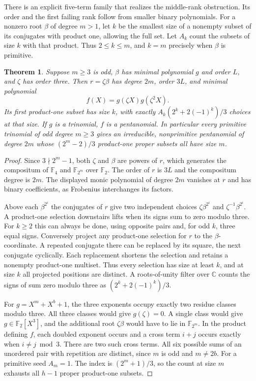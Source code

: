 \documentclass[11pt]{article}
\newtheorem{theorem}{Theorem}
\newcommand{\F}{\mathbb F_2}
\begin{document}
There is an explicit five-term family that realizes the middle-rank
obstruction. Its order and the first failing rank follow from smaller
binary polynomials. For a nonzero root \(\beta\) of degree \(m>1\),
let \(k\) be the smallest size of a nonempty subset of its conjugates
with product one, allowing the full set. Let \(A_k\) count the
subsets of size \(k\) with that product. Thus \(2\le k\le m\), and
\(k=m\) precisely when \(\beta\) is primitive.

\begin{theorem}\label{thm:cubic-root-twist}
Suppose \(m\ge3\) is odd, \(\beta\) has minimal polynomial \(g\) and
order \(L\), and \(\zeta\) has order three. Then \(r=\zeta\beta\)
has degree \(2m\), order \(3L\), and minimal polynomial
\[
                      f(X)=g(\zeta X)g(\zeta^2 X).
\]
Its first product-one subset has size \(k\), with exactly
\(A_k(2^k+2(-1)^k)/3\) choices at that size. If \(g\) is a trinomial,
\(f\) is a pentanomial. In particular every primitive trinomial
of odd degree \(m\ge3\) gives an irreducible, nonprimitive pentanomial
of degree \(2m\) whose \((2^m-2)/3\) product-one proper subsets
all have size \(m\).
\end{theorem}
\begin{proof}
Since \(3\nmid 2^m-1\), both \(\zeta\) and \(\beta\) are powers of
\(r\), which generates the compositum of \(\mathbb F_4\) and
\(\mathbb F_{2^m}\) over \(\mathbb F_2\). The order of \(r\) is
\(3L\) and the compositum degree is \(2m\). The displayed monic
polynomial of degree \(2m\) vanishes at \(r\) and has binary
coefficients, as Frobenius interchanges its factors.

Above each \(\beta^{2^i}\) the conjugates of \(r\) give two independent
choices \(\zeta\beta^{2^i}\) and \(\zeta^{-1}\beta^{2^i}\). A
product-one selection downstairs lifts when its signs sum to zero
modulo three. For \(k\ge2\) this can always be done, using opposite
pairs and, for odd \(k\), three equal signs. Conversely project
any product-one selection for \(r\) to the \(\beta\)-coordinate.
A repeated conjugate there can be replaced by its square, the next
conjugate cyclically. Each replacement shortens the selection and
retains a nonempty product-one multiset. Thus every selection has
size at least \(k\), and at size \(k\) all projected positions are
distinct. A roots-of-unity filter over \(\mathbb C\) counts the
signs of sum zero modulo three as \((2^k+2(-1)^k)/3\).

For \(g=X^m+X^b+1\), the three exponents occupy exactly two residue
classes modulo three. All three classes would give \(g(\zeta)=0\).
A single class would give \(g\in\F[X^3]\), and the additional root
\(\zeta\beta\) would have to lie in \(\mathbb F_{2^m}\).
In the product defining \(f\), each doubled exponent occurs and
a cross term \(i+j\) occurs exactly when \(i\ne j\bmod3\).
There are two such cross terms. All six possible sums of an unordered
pair with repetition are distinct, since \(m\) is odd and \(m\ne2b\).
For a primitive seed \(A_m=1\). The index is \((2^m+1)/3\), so the
count at size \(m\) exhausts all \(h-1\) proper product-one subsets.
\end{proof}
\end{document}
